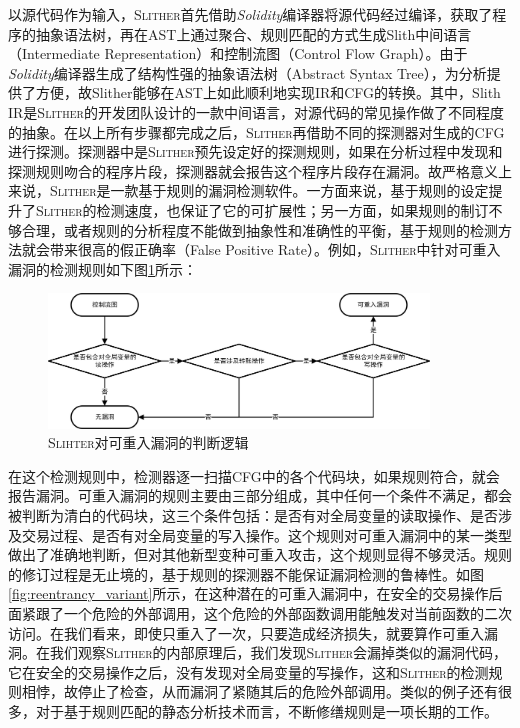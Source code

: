 以源代码作为输入，\textsc{Slither}首先借助\emph{Solidity}编译器将源代码经过编译，获取了程序的抽象语法树，再在AST上通过聚合、规则匹配的方式生成Slith中间语言（Intermediate Representation）和控制流图（Control Flow Graph）。由于\emph{Solidity}编译器生成了结构性强的抽象语法树（Abstract Syntax Tree），为分析提供了方便，故Slither能够在AST上如此顺利地实现IR和CFG的转换。其中，Slith IR是\textsc{Slither}的开发团队设计的一款中间语言，对源代码的常见操作做了不同程度的抽象。在以上所有步骤都完成之后，\textsc{Slither}再借助不同的探测器对生成的CFG进行探测。探测器中是\textsc{Slither}预先设定好的探测规则，如果在分析过程中发现和探测规则吻合的程序片段，探测器就会报告这个程序片段存在漏洞。故严格意义上来说，\textsc{Slither}是一款基于规则的漏洞检测软件。一方面来说，基于规则的设定提升了\textsc{Slither}的检测速度，也保证了它的可扩展性；另一方面，如果规则的制订不够合理，或者规则的分析程度不能做到抽象性和准确性的平衡，基于规则的检测方法就会带来很高的假正确率（False Positive Rate）。例如，\textsc{Slither}中针对可重入漏洞的检测规则如下图\ref{fig:slither_reentrancy_flow}所示：

\begin{figure}
\vspace{+2mm}
  \centering
  \includegraphics[width=0.9\textwidth]{figures/slither_reentrancy_flow.png}
  \caption{\textsc{Slihter}对可重入漏洞的判断逻辑}
  \label{fig:slither_reentrancy_flow}
\vspace{-5mm}
\end{figure}

在这个检测规则中，检测器逐一扫描CFG中的各个代码块，如果规则符合，就会报告漏洞。可重入漏洞的规则主要由三部分组成，其中任何一个条件不满足，都会被判断为清白的代码块，这三个条件包括：是否有对全局变量的读取操作、是否涉及交易过程、是否有对全局变量的写入操作。这个规则对可重入漏洞中的某一类型做出了准确地判断，但对其他新型变种可重入攻击，这个规则显得不够灵活。规则的修订过程是无止境的，基于规则的探测器不能保证漏洞检测的鲁棒性。如图\ref{fig:reentrancy_variant}所示，在这种潜在的可重入漏洞中，在安全的交易操作后面紧跟了一个危险的外部调用，这个危险的外部函数调用能触发对当前函数的二次访问。在我们看来，即使只重入了一次，只要造成经济损失，就要算作可重入漏洞。在我们观察\textsc{Slither}的内部原理后，我们发现\textsc{Slither}会漏掉类似的漏洞代码，它在安全的交易操作之后，没有发现对全局变量的写操作，这和\textsc{Slither}的检测规则相悖，故停止了检查，从而漏洞了紧随其后的危险外部调用。类似的例子还有很多，对于基于规则匹配的静态分析技术而言，不断修缮规则是一项长期的工作。

